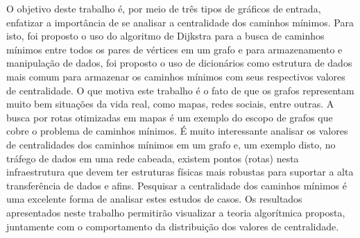 \begin{resumo}
	O objetivo deste trabalho é, por meio de três tipos de gráficos de entrada, enfatizar a importância de se analisar a centralidade dos caminhos mínimos. Para isto, foi proposto o uso do algoritmo de Dijkstra para a busca de caminhos mínimos entre todos os pares de vértices em um grafo e para armazenamento e manipulação de dados, foi proposto o uso de dicionários como estrutura de dados mais comum para armazenar os caminhos mínimos com seus respectivos valores de centralidade. O que motiva este trabalho é o fato de que os grafos representam muito bem situações da vida real, como mapas, redes sociais, entre outras. A busca por rotas otimizadas em mapas é um exemplo do escopo de grafos que cobre o problema de caminhos mínimos. É muito interessante analisar os valores de centralidades dos caminhos mínimos em um grafo e, um exemplo disto, no tráfego de dados em uma rede cabeada, existem pontos (rotas) nesta infraestrutura que devem ter estruturas físicas mais robustas para suportar a alta transferência de dados e afins. Pesquisar a centralidade dos caminhos mínimos é uma excelente forma de analisar estes estudos de casos. Os resultados apresentados neste trabalho permitirão visualizar a teoria algorítmica proposta, juntamente com o comportamento da distribuição dos valores de centralidade. \newline \newline
\end{resumo}
